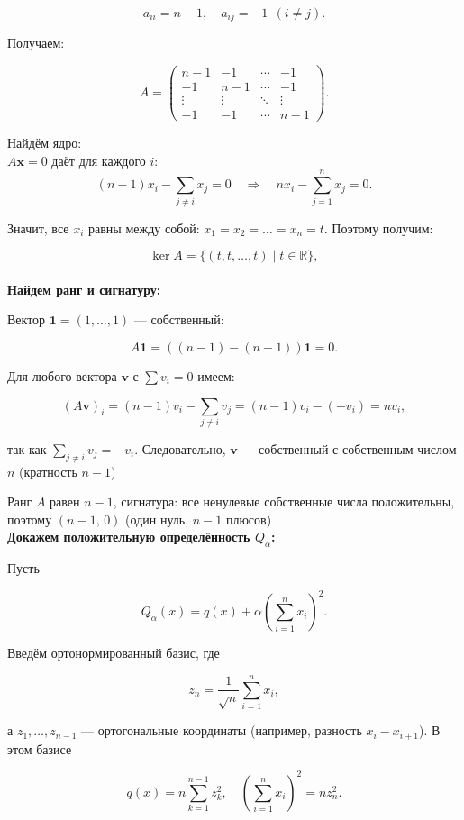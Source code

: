 \documentclass[12pt,final,oneside]{extreport}%
\begin{document}
\[
a_{ii} = n-1,\quad a_{ij} = -1\ \ (i\neq j).
\]

Получаем:

\[
A = \begin{pmatrix}
n-1 & -1 & \cdots & -1 \\
-1 & n-1 & \cdots & -1 \\
\vdots & \vdots & \ddots & \vdots \\
-1 & -1 & \cdots & n-1
\end{pmatrix}.
\]

Найдём ядро: \\

$A\mathbf{x}=0$ даёт для каждого $i$:
\[
(n-1)x_i - \sum_{j\neq i} x_j = 0 \quad\Rightarrow\quad n x_i - \sum_{j=1}^n x_j = 0.
\]

Значит, все $x_i$ равны между собой: $x_1 = x_2 = \dots = x_n = t$. Поэтому получим:

\[
\ker A = \{(t, t, \dots, t) \mid t \in \mathbb{R}\},
\] \\

\textbf{Найдем ранг и сигнатуру:}

Вектор $\mathbf{1} = (1,\dots,1)$ — собственный:

\[
A\mathbf{1} = ((n-1) - (n-1))\mathbf{1} = 0.
\]

Для любого вектора $\mathbf{v}$ с $\sum v_i = 0$ имеем:

\[
(A\mathbf{v})_i = (n-1)v_i - \sum_{j\neq i} v_j = (n-1)v_i - (-v_i) = n v_i,
\]

так как $\sum_{j\neq i} v_j = -v_i$. Следовательно, $ \mathbf{v} $ — собственный с собственным числом $n$ (кратность $n-1$)

Ранг $A$ равен $n-1$, сигнатура: все ненулевые собственные числа положительны, поэтому $(n-1,\, 0)$ (один нуль, $n-1$ плюсов) \\

\textbf{Докажем положительную определённость $Q_\alpha$:}

Пусть

\[
Q_\alpha(x) = q(x) + \alpha\left(\sum_{i=1}^n x_i\right)^2.
\]

Введём ортонормированный базис, где

\[
z_n = \frac{1}{\sqrt{n}}\sum_{i=1}^n x_i,
\]

а $z_1, \dots, z_{n-1}$ — ортогональные координаты (например, разность $x_i - x_{i+1}$). В этом базисе

\[
q(x) = n\sum_{k=1}^{n-1} z_k^2,\quad \left(\sum_{i=1}^n x_i\right)^2 = n z_n^2.
\]
\end{document}
